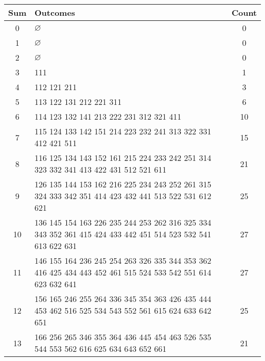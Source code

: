 \documentclass[class=math239,notes]{agony}
\begin{document}
\begin{enumerate}
\begin{sol}
\begin{center}
\begin{tabular}{c|l|c}
              Sum & Outcomes                                                                                                    & Count \\ \hline
              0   & $\varnothing$                                                                                               & 0     \\
              1   & $\varnothing$                                                                                               & 0     \\
              2   & $\varnothing$                                                                                               & 0     \\
              3   & 111                                                                                                         & 1     \\
              4   & 112 121 211                                                                                                 & 3     \\
              5   & 113 122 131 212 221 311                                                                                     & 6     \\
              6   & 114 123 132 141 213 222 231 312 321 411                                                                     & 10    \\
              7   & 115 124 133 142 151 214 223 232 241 313 322 331 412 421 511                                                 & 15    \\
              8   & 116 125 134 143 152 161 215 224 233 242 251 314 323 332 341 413 422 431 512 521 611                         & 21    \\
              9   & 126 135 144 153 162 216 225 234 243 252 261 315 324 333 342 351 414 423 432 441 513 522 531 612 621         & 25    \\
              10  & 136 145 154 163 226 235 244 253 262 316 325 334 343 352 361 415 424 433 442 451 514 523 532 541 613 622 631 & 27    \\
              11  & 146 155 164 236 245 254 263 326 335 344 353 362 416 425 434 443 452 461 515 524 533 542 551 614 623 632 641 & 27    \\
              12  & 156 165 246 255 264 336 345 354 363 426 435 444 453 462 516 525 534 543 552 561 615 624 633 642 651         & 25    \\
              13  & 166 256 265 346 355 364 436 445 454 463 526 535 544 553 562 616 625 634 643 652 661                         & 21    \\

\end{tabular}
\end{center}
\end{sol}
\end{enumerate}
\end{document}
